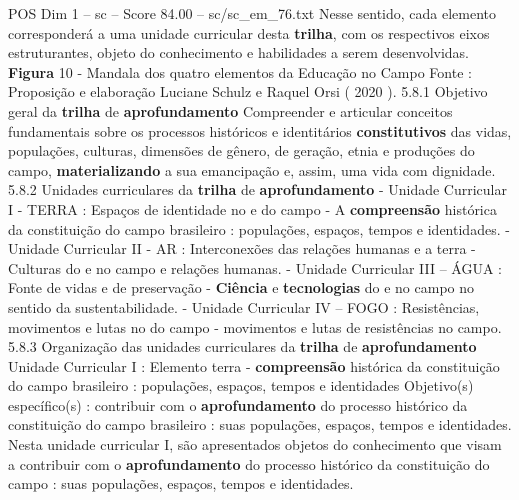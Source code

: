 \begin{textsample}{POS Dim 1 – sc – Score 84.00 – sc/sc\_em\_76.txt}
Nesse sentido, cada elemento corresponderá a uma unidade curricular desta \textbf{trilha}, com os respectivos eixos estruturantes, objeto do conhecimento e habilidades a serem desenvolvidas. \textbf{Figura} 10 - Mandala dos quatro elementos da Educação no Campo Fonte : Proposição e elaboração Luciane Schulz e Raquel Orsi ( 2020 ). 5.8.1 Objetivo geral da \textbf{trilha} de \textbf{aprofundamento} Compreender e articular conceitos fundamentais sobre os processos históricos e identitários \textbf{constitutivos} das vidas, populações, culturas, dimensões de gênero, de geração, etnia e produções do campo, \textbf{materializando} a sua emancipação e, assim, uma vida com dignidade. 5.8.2 Unidades curriculares da \textbf{trilha} de \textbf{aprofundamento} - Unidade Curricular I - TERRA : Espaços de identidade no e do campo - A \textbf{compreensão} histórica da constituição do campo brasileiro : populações, espaços, tempos e identidades. - Unidade Curricular II - AR : Interconexões das relações humanas e a terra - Culturas do e no campo e relações humanas. - Unidade Curricular III – ÁGUA : Fonte de vidas e de preservação - \textbf{Ciência} e \textbf{tecnologias} do e no campo no sentido da sustentabilidade. - Unidade Curricular IV – FOGO : Resistências, movimentos e lutas no do campo - movimentos e lutas de resistências no campo. 5.8.3 Organização das unidades curriculares da \textbf{trilha} de \textbf{aprofundamento} Unidade Curricular I : Elemento terra - \textbf{compreensão} histórica da constituição do campo brasileiro : populações, espaços, tempos e identidades Objetivo(s) específico(s) : contribuir com o \textbf{aprofundamento} do processo histórico da constituição do campo brasileiro : suas populações, espaços, tempos e identidades.
Nesta unidade curricular I, são apresentados objetos do conhecimento que visam a contribuir com o \textbf{aprofundamento} do processo histórico da constituição do campo : suas populações, espaços, tempos e identidades.

\end{textsample}
